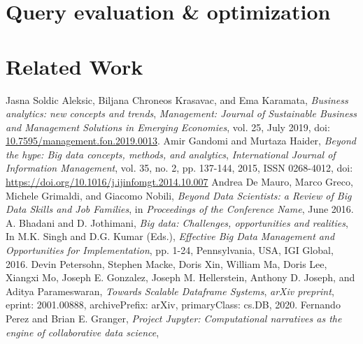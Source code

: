 \documentclass[journal]{IEEEtran} %
\begin{document}


\section{Query evaluation \& optimization}



\newpage
\section{Related Work}



\begin{thebibliography}{00}            
    Jasna Soldic Aleksic, Biljana Chroneos Krasavac, and Ema Karamata,
    \emph{Business analytics: new concepts and trends},
    \emph{Management: Journal of Sustainable Business and Management Solutions in Emerging Economies}, 
    vol. 25, 
    July 2019,
    doi: \url{10.7595/management.fon.2019.0013}.
    Amir Gandomi and Murtaza Haider,
    \emph{Beyond the hype: Big data concepts, methods, and analytics},
    \emph{International Journal of Information Management}, 
    vol. 35, 
    no. 2, 
    pp. 137-144, 
    2015,
    ISSN 0268-4012,
    doi: \url{https://doi.org/10.1016/j.ijinfomgt.2014.10.007}
    Andrea De Mauro, Marco Greco, Michele Grimaldi, and Giacomo Nobili,
    \emph{Beyond Data Scientists: a Review of Big Data Skills and Job Families},
    in \emph{Proceedings of the Conference Name}, %
    June 2016.
    A. Bhadani and D. Jothimani,
    \emph{Big data: Challenges, opportunities and realities},
    In M.K. Singh and D.G. Kumar (Eds.),
    \emph{Effective Big Data Management and Opportunities for Implementation},
    pp. 1-24,
    Pennsylvania, USA,
    IGI Global,
    2016.
    Devin Petersohn, Stephen Macke, Doris Xin, William Ma, Doris Lee, Xiangxi Mo, Joseph E. Gonzalez, Joseph M. Hellerstein, Anthony D. Joseph, and Aditya Parameswaran,
    \emph{Towards Scalable Dataframe Systems},
    \emph{arXiv preprint},
    eprint: 2001.00888,
    archivePrefix: arXiv,
    primaryClass: cs.DB,
    2020.    
    Fernando Perez and Brian E. Granger,
    \emph{Project Jupyter: Computational narratives as the engine of collaborative data science},

\end{thebibliography}
\end{document}
